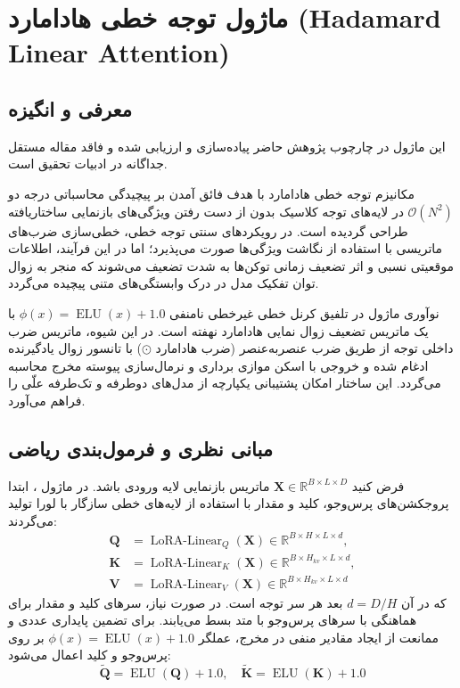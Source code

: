 \section{ماژول توجه خطی هادامارد (Hadamard Linear Attention)}
\label{sec:module_hla_attention}

\subsection{معرفی و انگیزه}
این ماژول در چارچوب پژوهش حاضر پیاده‌سازی و ارزیابی شده و فاقد مقاله مستقل جداگانه در ادبیات تحقیق است.

مکانیزم توجه خطی هادامارد  با هدف فائق آمدن بر پیچیدگی محاسباتی درجه دو $\mathcal{O}(N^2)$ در لایه‌های توجه کلاسیک بدون از دست رفتن ویژگی‌های بازنمایی ساختاریافته طراحی گردیده است. در رویکردهای سنتی توجه خطی، خطی‌سازی ضرب‌های ماتریسی با استفاده از نگاشت ویژگی‌ها صورت می‌پذیرد؛ اما در این فرآیند، اطلاعات موقعیتی نسبی و اثر تضعیف زمانی توکن‌ها به شدت تضعیف می‌شوند که منجر به زوال توان تفکیک مدل در درک وابستگی‌های متنی پیچیده می‌گردد.

نوآوری ماژول  در تلفیق کرنل خطی غیرخطی نامنفی $\phi(x) = \operatorname{ELU}(x) + 1.0$ با یک ماتریس تضعیف زوال نمایی هادامارد  نهفته است. در این شیوه، ماتریس ضرب داخلی توجه از طریق ضرب عنصر‌به‌عنصر (ضرب هادامارد $\odot$) با تانسور زوال یادگیرنده ادغام شده و خروجی با اسکن موازی برداری و نرمال‌سازی پیوسته مخرج محاسبه می‌گردد. این ساختار امکان پشتیبانی یکپارچه از مدل‌های دوطرفه  و تک‌طرفه علّی  را فراهم می‌آورد.

\subsection{مبانی نظری و فرمول‌بندی ریاضی}
فرض کنید $\mathbf{X} \in \mathbb{R}^{B \times L \times D}$ ماتریس بازنمایی لایه ورودی باشد. در ماژول ، ابتدا پروجکشن‌های پرس‌وجو، کلید و مقدار با استفاده از لایه‌های خطی سازگار با لورا تولید می‌گردند:
\begin{align}
\mathbf{Q} &= \operatorname{LoRA-Linear}_Q(\mathbf{X}) \in \mathbb{R}^{B \times H \times L \times d}, \\
\mathbf{K} &= \operatorname{LoRA-Linear}_K(\mathbf{X}) \in \mathbb{R}^{B \times H_{kv} \times L \times d}, \\
\mathbf{V} &= \operatorname{LoRA-Linear}_V(\mathbf{X}) \in \mathbb{R}^{B \times H_{kv} \times L \times d}
\end{align}
که در آن $d = D / H$ بعد هر سر توجه است. در صورت نیاز، سرهای کلید و مقدار برای هماهنگی با سرهای پرس‌وجو با متد  بسط می‌یابند. برای تضمین پایداری عددی و ممانعت از ایجاد مقادیر منفی در مخرج، عملگر $\phi(x) = \operatorname{ELU}(x) + 1.0$ بر روی پرس‌وجو و کلید اعمال می‌شود:
\begin{equation}
\tilde{\mathbf{Q}} = \operatorname{ELU}(\mathbf{Q}) + 1.0, \quad \tilde{\mathbf{K}} = \operatorname{ELU}(\mathbf{K}) + 1.0
\end{equation}

